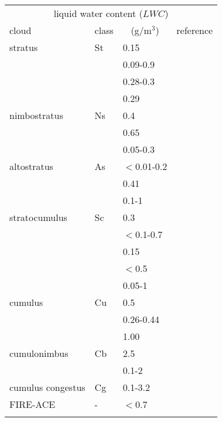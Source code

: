 \begin{table}[!htb]
\begin{center}
\begin{tabular}{llll}
\hline
\multicolumn{4}{c}{liquid water content ($LWC$)} \\
 cloud        & class & \multicolumn{1}{c}{(g/m$^3$)} & reference\\
\hline
 stratus      & St    & 0.15        & \citet{salby:96}\\
              &       & 0.09-0.9    & \citet{seinfeld:98}\\
              &       & 0.28-0.3    & \citet{hess:98}\\
              &       & 0.29        & \citet{abreu:96}\\
 nimbostratus & Ns    & 0.4         & \citet{salby:96}\\
              &       & 0.65        & \citet{abreu:96}\\
              &       & 0.05-0.3    & \citet{berton:00}\\
 altostratus  & As    & $<$0.01-0.2 & \citet{seinfeld:98}\\
              &       & 0.41        & \citet{abreu:96}\\
              &       & 0.1-1       & \citet{berton:00}\\
 stratocumulus& Sc    & 0.3         & \citet{salby:96}\\
              &       & $<$0.1-0.7  & \citet{seinfeld:98}\\
              &       & 0.15        & \citet{abreu:96}\\
              &       & $<$0.5      & \citet{pawlowskaetal:00}\\
              &       & 0.05-1      & \citet{berton:00}\\
 cumulus      & Cu    & 0.5         & \citet{salby:96}\\
              &       & 0.26-0.44   & \citet{hess:98}\\
              &       & 1.00        & \citet{abreu:96}\\
 cumulonimbus & Cb    & 2.5         & \citet{salby:96}\\
              &       & 0.1-2       & \citet{berton:00}\\
 cumulus 
    congestus & Cg    & 0.1-3.2     & \citet{berton:00}\\
FIRE-ACE      & -     & $<$0.7      & \citet{shupeetal:00}\\
\hline
\multicolumn{4}{c}{}  \\

\end{tabular}
\end{center}
\end{table}
